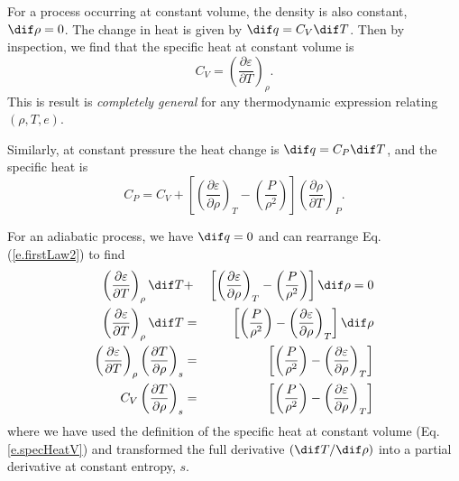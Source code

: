 For a process occurring at constant volume, the density is also constant, $\dif \rho=0$.
The change in heat is given by $\dif q = C_V \dif T$.
Then by inspection, we find that the specific heat at constant volume is
\begin{equation}
	C_V = \left(\frac{\partial \varepsilon}{\partial T}\right)_\rho. \label{e.specHeatV}
\end{equation}
This is result is {\it completely general} for any thermodynamic expression relating $(\rho, T, e)$.

Similarly, at constant pressure the heat change is $\dif q = C_P \dif T$, and the specific heat is
\begin{equation}
	C_P = C_V + \left[\left(\frac{\partial \varepsilon}{\partial \rho}\right)_T - \left(\frac{P}{\rho^2}\right) \right] \left(\frac{\partial \rho}{\partial T}\right)_P. \label{e.specHeatP}
\end{equation}

For an adiabatic process, we have $\dif q = 0$ and can rearrange Eq. (\ref{e.firstLaw2}) to find
\begin{eqnarray}
		\left(\frac{\partial \varepsilon}{\partial T}\right)_\rho \dif T &+& \left[\left(\frac{\partial \varepsilon}{\partial \rho}\right)_T - \left(\frac{P}{\rho^2}\right)\right] \dif \rho = 0 \nonumber \\
		 \left(\frac{\partial \varepsilon}{\partial T}\right)_\rho \dif T &=& \left[\left(\frac{P}{\rho^2}\right) -\left(\frac{\partial \varepsilon}{\partial \rho}\right)_T \right] \dif \rho  \nonumber\\
		 \left(\frac{\partial \varepsilon}{\partial T}\right)_\rho \left(\frac{\partial T}{\partial \rho}\right)_s  &=& \left[\left(\frac{P}{\rho^2}\right) -\left(\frac{\partial \varepsilon}{\partial \rho}\right)_T \right] \nonumber\\
		 C_V \left(\frac{\partial T}{\partial \rho}\right)_s  &=& \left[\left(\frac{P}{\rho^2}\right) -\left(\frac{\partial \varepsilon}{\partial \rho}\right)_T \right]
\end{eqnarray}
where we have used the definition of the specific heat at constant volume (Eq. \ref{e.specHeatV}) and transformed the full derivative $(\dif T/\dif \rho)$ into a partial derivative at constant entropy, $s$.

